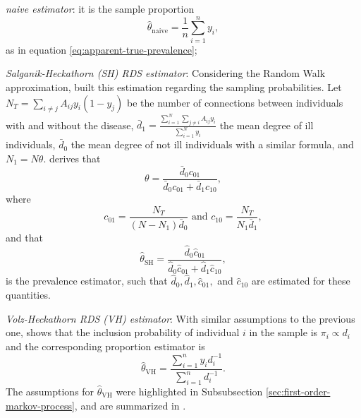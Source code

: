 \begin{alineas}
  \item {\em naive estimator}: it is the sample proportion 
  \begin{equation*}
    \hat{\theta}_{\mathrm{naive}} = \frac{1}{n}\sum_{i=1}^n y_i,
  \end{equation*} 
  as in equation \eqref{eq:apparent-true-prevalence}; 

  \item {\em Salganik-Heckathorn (SH) RDS
  estimator}: Considering the Random Walk
  approximation, \textcite{salganik2004sampling} built this estimation
  regarding the sampling probabilities. Let $N_T = \sum_{i \neq j} A_{ij}y_i(1-
  y_j)$ be the number of connections between individuals with and without the
  disease, $\bar{d}_1 = \frac{\sum_{i=1}^N \sum_{j \neq i}
  A_{ij}y_i}{\sum_{i=1}^N y_i}$ the mean degree of ill individuals,
  $\bar{d}_0$ the mean degree of not ill individuals with a similar formula,
  and $N_1 = N\theta$. \textcite[p. 218]{salganik2004sampling} derives that 
  \begin{equation*}
    \theta = \frac{\bar{d}_0 c_{01}}{\bar{d}_0 c_{01} + \bar{d}_1 c_{10}},
  \end{equation*}
  where 
  \begin{equation*}
    c_{01} = \frac{N_T}{(N - N_1)\bar{d}_0} \text{ and } c_{10} = \frac{N_T}{N_1\bar{d}_1},
  \end{equation*}
  and that 
  \begin{equation}
    \label{eq:salganik-estimator}
    \hat{\theta}_{\mathrm{SH}} = \frac{\widehat{d}_0 \hat{c}_{01}}{\widehat{d}_0 \hat{c}_{01} + \widehat{d}_1 \hat{c}_{10}},
  \end{equation}
  is the prevalence estimator, such that $\widehat{d}_0, \widehat{d}_1,
  \hat{c}_{01},$ and $\hat{c}_{10}$ are estimated for these quantities. 

  \item {\em Volz-Heckathorn RDS (VH) estimator}: With similar assumptions to the
  previous one, \textcite[p. 85]{volz2008probability} shows that the inclusion
   probability of individual $i$ in the sample is $\pi_i \propto
  d_i$ and the corresponding proportion estimator is  
  \begin{equation}
    \hat{\theta}_{\mathrm{VH}} = \frac{\sum_{i=1}^n y_i d_i^{-1}}{\sum_{i=1}^n d_i^{-1}}.
  \end{equation}
  The assumptions for $\hat{\theta}_{\mathrm{VH}}$ were highlighted in Subsubsection
  \ref{sec:first-order-markov-process}, and are summarized in \cite[Table
  1][p. 71]{gile2018methods}. 
  

\end{alineas}
